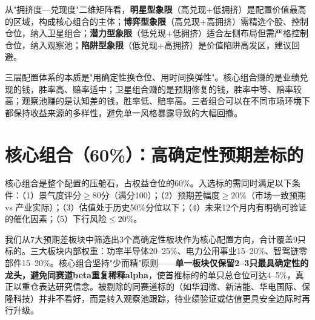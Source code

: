 \begin{exhibitbox}
{%
}
\vspace{0.2cm}
\end{exhibitbox}

从"拥挤度—兑现度"二维矩阵看，\textbf{明星型象限}（高兑现+低拥挤）是配置价值最高的区域，构成核心组合的主体；\textbf{博弈型象限}（高兑现+高拥挤）需精选个股、控制仓位，纳入卫星组合；\textbf{潜力型象限}（低兑现+低拥挤）适合左侧布局但需严格控制仓位，纳入观察池；\textbf{陷阱型象限}（低兑现+高拥挤）是价值陷阱高发区，建议回避。

\begin{keyinsight}[三层配置的核心逻辑]
三层配置体系的本质是"用确定性换仓位、用时间换弹性"。核心组合赚的是业绩兑现的钱，胜率高、赔率适中；卫星组合赚的是预期修复的钱，胜率中等、赔率较高；观察池赚的是认知差的钱，胜率低、赔率高。三者组合可以在不同市场环境下都保持收益来源的多样性，避免单一风格暴露导致的大幅回撤。
\end{keyinsight}

\section{核心组合（60\%）：高确定性预期差标的}

核心组合是整个配置的压舱石，占权益仓位的60\%。入选标的需同时满足以下条件：（1）景气度评分$\geq{}$80分（满分100）；（2）预期差幅度$\geq{}20\%$（市场一致预期 vs 产业实际）；（3）估值处于历史50\%分位以下；（4）未来12个月内有明确可验证的催化因素；（5）下行风险$\leq{}20\%$。

我们从7大预期差板块中筛选出3个高确定性板块作为核心配置方向，合计覆盖9只标的。三大板块内部权重：功率半导体20--25\%、电力公用事业15--20\%、智驾链零部件15--20\%。核心组合坚持"少而精"原则——\textbf{单一板块仅保留2--3只最具确定性的龙头，避免同赛道beta重复稀释alpha}，使首推标的的单只总仓位可达4--5\%，真正以重仓表达研究信念。被剔除的同赛道标的（如华润微、新洁能、华电国际、保隆科技）并非不看好，而是转入观察池跟踪，待业绩验证或估值更具安全边际时再行升级。

